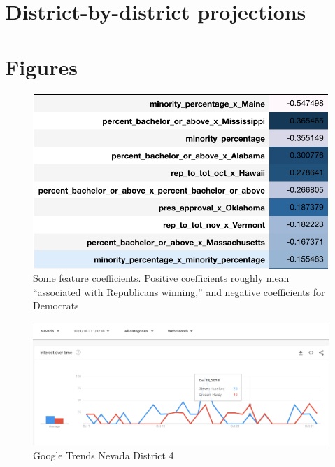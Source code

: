 \documentclass[12pt, letterpaper]{article}
\begin{document}


\newpage
\appendix

\section{District-by-district projections}
\label{sec:district_results}





\section{Figures}
\label{sec:figures}

\begin{figure}[tbh]
  \centering
  \includegraphics[scale=0.8]{feature_coeff}
  \caption{Some feature coefficients. Positive coefficients roughly mean ``associated with Republicans winning,'' and negative coefficients for Democrats}
  \label{fig:feature}
\end{figure}

 \begin{figure}[tbh]
  \centering
  \includegraphics[scale=0.4]{google_trends_ex}
  \caption{Google Trends Nevada District 4}
  \label{fig:trends}
\end{figure}
\end{document}
